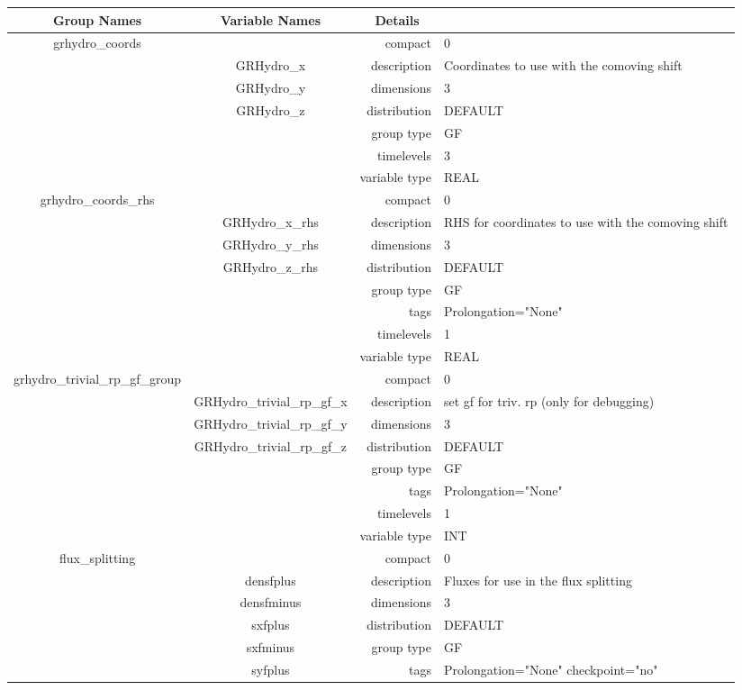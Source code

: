 \documentclass{article}
\begin{document}
\begin{tabular*}{150mm}{|c|c@{\extracolsep{\fill}}|rl|} \hline 
~ {\bf Group Names} ~ & ~ {\bf Variable Names} ~  &{\bf Details} ~ & ~ \\ 
\hline 
grhydro\_coords &  & compact & 0 \\ 
 & GRHydro\_x & description & Coordinates to use with the comoving shift \\ 
 & GRHydro\_y & dimensions & 3 \\ 
 & GRHydro\_z & distribution & DEFAULT \\ 
 &  & group type & GF \\ 
 &  & timelevels & 3 \\ 
 &  & variable type & REAL \\ 
\hline 
grhydro\_coords\_rhs &  & compact & 0 \\ 
 & GRHydro\_x\_rhs & description & RHS for coordinates to use with the comoving shift \\ 
 & GRHydro\_y\_rhs & dimensions & 3 \\ 
 & GRHydro\_z\_rhs & distribution & DEFAULT \\ 
 &  & group type & GF \\ 
 &  & tags & Prolongation="None" \\ 
 &  & timelevels & 1 \\ 
 &  & variable type & REAL \\ 
\hline 
grhydro\_trivial\_rp\_gf\_group &  & compact & 0 \\ 
 & GRHydro\_trivial\_rp\_gf\_x & description & set gf for triv. rp (only for debugging) \\ 
 & GRHydro\_trivial\_rp\_gf\_y & dimensions & 3 \\ 
 & GRHydro\_trivial\_rp\_gf\_z & distribution & DEFAULT \\ 
 &  & group type & GF \\ 
 &  & tags & Prolongation="None" \\ 
 &  & timelevels & 1 \\ 
 &  & variable type & INT \\ 
\hline 
flux\_splitting &  & compact & 0 \\ 
 & densfplus & description & Fluxes for use in the flux splitting \\ 
 & densfminus & dimensions & 3 \\ 
 & sxfplus & distribution & DEFAULT \\ 
 & sxfminus & group type & GF \\ 
 & syfplus & tags & Prolongation="None" checkpoint="no" \\ 

\end{tabular*}
\end{document}
